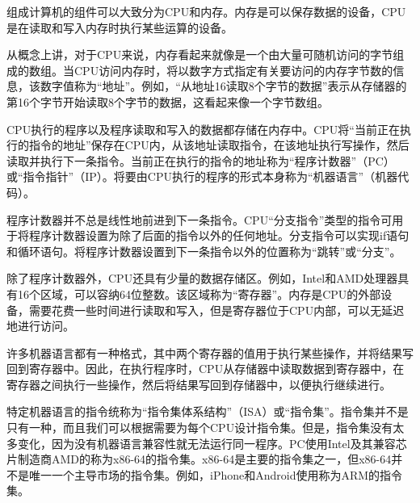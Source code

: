 \documentclass[cn,10pt,math=newtx,citestyle=gb7714-2015,bibstyle=gb7714-2015]{elegantbook}
\begin{document}
组成计算机的组件可以大致分为CPU和内存。内存是可以保存数据的设备，CPU是在读取和写入内存时执行某些运算的设备。

从概念上讲，对于CPU来说，内存看起来就像是一个由大量可随机访问的字节组成的数组。当CPU访问内存时，将以数字方式指定有关要访问的内存字节数的信息，该数字值称为“地址”。例如，“从地址16读取8个字节的数据”表示从存储器的第16个字节开始读取8个字节的数据，这看起来像一个字节数组。

CPU执行的程序以及程序读取和写入的数据都存储在内存中。CPU将“当前正在执行的指令的地址”保存在CPU内，从该地址读取指令，在该地址执行写操作，然后读取并执行下一条指令。当前正在执行的指令的地址称为“程序计数器”（PC）或“指令指针”（IP）。将要由CPU执行的程序的形式本身称为“机器语言”（机器代码）。

程序计数器并不总是线性地前进到下一条指令。CPU“分支指令”类型的指令可用于将程序计数器设置为除了后面的指令以外的任何地址。分支指令可以实现if语句和循环语句。将程序计数器设置到下一条指令以外的位置称为“跳转”或“分支”。

除了程序计数器外，CPU还具有少量的数据存储区。例如，Intel和AMD处理器具有16个区域，可以容纳64位整数。该区域称为“寄存器”。内存是CPU的外部设备，需要花费一些时间进行读取和写入，但是寄存器位于CPU内部，可以无延迟地进行访问。

许多机器语言都有一种格式，其中两个寄存器的值用于执行某些操作，并将结果写回到寄存器中。因此，在执行程序时，CPU从存储器中读取数据到寄存器中，在寄存器之间执行一些操作，然后将结果写回到存储器中，以便执行继续进行。

特定机器语言的指令统称为“指令集体系结构”（ISA）或“指令集”。指令集并不是只有一种，而且我们可以根据需要为每个CPU设计指令集。但是，指令集没有太多变化，因为没有机器语言兼容性就无法运行同一程序。PC使用Intel及其兼容芯片制造商AMD的称为x86-64的指令集。x86-64是主要的指令集之一，但x86-64并不是唯一一个主导市场的指令集。例如，iPhone和Android使用称为ARM的指令集。
\end{document}
